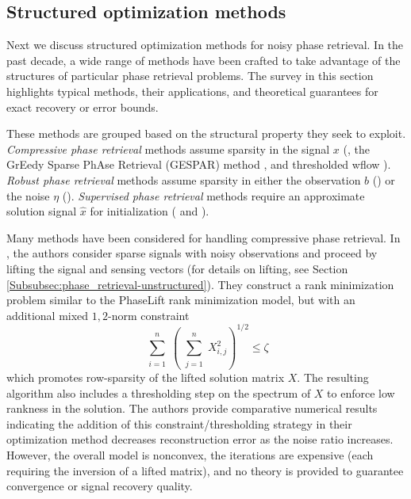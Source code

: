 \subsection{Structured optimization methods}  	\label{Subsubsec:phase_retrieval-structured}


Next we discuss structured optimization methods for noisy phase retrieval.  In the past decade, a wide range of methods have been crafted to take advantage of the structures of particular phase retrieval problems.  The survey in this section highlights typical methods, their applications, and theoretical guarantees for exact recovery or error bounds.  

These methods are grouped based on the structural property they seek to exploit.  \textit{Compressive phase retrieval} methods assume sparsity in the signal $x$ (\cite{DBLP:journals/corr/abs-1104-4406}, the GrEedy Sparse PhAse Retrieval (GESPAR) method \cite{shechtman2014gespar}, and thresholded wflow  \cite{cai2016optimal}).  \textit{Robust phase retrieval} methods assume sparsity in either the observation $b$ (\cite{katkovnik2017phase}) or the noise $\eta$  (\cite{jiang2017robust}).  \textit{Supervised phase retrieval} methods require an approximate solution signal $\hat{x}$ for initialization (\cite{goldstein2018phasemax} and \cite{bahmani2016phase}).  




Many methods have been considered for handling compressive phase retrieval.  In \cite{DBLP:journals/corr/abs-1104-4406}, the authors consider sparse signals with noisy observations and proceed by lifting the signal and sensing vectors (for details on lifting, see Section \ref{Subsubsec:phase_retrieval-unstructured}).  They construct a rank minimization problem similar to the PhaseLift rank minimization model, but with an additional mixed $1,2$-norm constraint
\[
	\sum\limits_{\substack{i = 1}}^{\substack{n}}
	\left( 	\sum\limits_{\substack{j = 1}}^{\substack{n}}  X_{i, j}^2
	\right)^{1/2}
	\leq \zeta
\]
which promotes row-sparsity of the lifted solution matrix $X$.  The resulting algorithm also includes a thresholding step on the spectrum of $X$ to enforce low rankness in the solution.   The authors provide comparative numerical results indicating the addition of this constraint/thresholding strategy in their optimization method decreases reconstruction error as the noise ratio increases.  However, the overall model is nonconvex, the iterations are expensive (each requiring the inversion of a lifted matrix), and no theory is provided to guarantee convergence or signal recovery quality.

